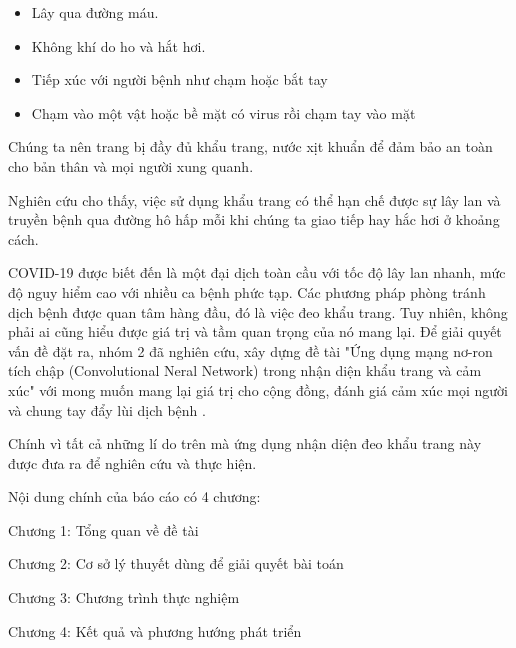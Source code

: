 \begin{itemize}
	\item Lây qua đường máu.
	
	\item Không khí do ho và hắt hơi.
	
	\item Tiếp xúc với người bệnh như chạm hoặc bắt tay
	
	\item Chạm vào một vật hoặc bề mặt có virus rồi chạm tay vào mặt
\end{itemize}

Chúng ta nên trang bị đầy đủ khẩu trang, nước xịt khuẩn để đảm bảo an toàn cho bản thân và mọi người xung quanh.

Nghiên cứu cho thấy, việc sử dụng khẩu trang có thể hạn chế được sự lây lan và truyền bệnh qua đường hô hấp mỗi khi chúng ta giao tiếp hay hắc hơi ở khoảng cách.

COVID-19 được biết đến là một đại dịch toàn cầu với tốc độ lây lan nhanh, mức độ nguy hiểm cao với nhiều ca bệnh phức tạp. Các phương pháp phòng tránh dịch bệnh được quan tâm hàng đầu, đó là việc đeo khẩu trang. Tuy nhiên, không phải ai cũng hiểu được giá trị và tầm quan trọng của nó mang lại. Để giải quyết vấn đề đặt ra, nhóm 2 đã nghiên cứu, xây dựng đề tài "Ứng dụng mạng nơ-ron tích chập (Convolutional Neral Network) trong nhận diện khẩu trang và cảm xúc" với mong muốn mang lại giá trị cho cộng đồng, đánh giá cảm xúc mọi người và chung tay đẩy lùi dịch bệnh . 

Chính vì tất cả những lí do trên mà ứng dụng nhận diện đeo khẩu trang này được đưa ra để nghiên cứu và thực hiện.

Nội dung chính của báo cáo có 4 chương:

Chương 1: Tổng quan về đề tài

Chương 2: Cơ sở lý thuyết dùng để giải quyết bài toán

Chương 3: Chương trình thực nghiệm  

Chương 4: Kết quả và phương hướng phát triển  
 


